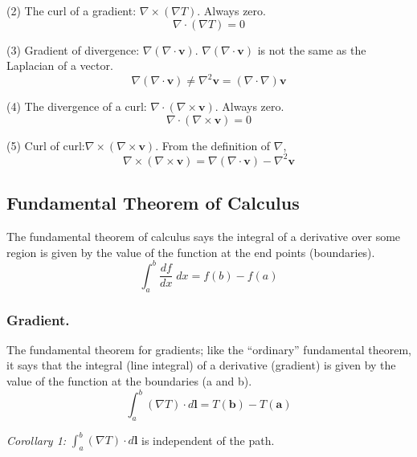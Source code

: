 \documentclass[../../../main.tex]{subfiles}
\begin{document}
(2) The curl of a gradient: $\nabla \times (\nabla T)$. Always zero.
\begin{equation*}
    \nabla \cdot (\nabla T)=0
\end{equation*}

(3) Gradient of divergence: $\nabla  (\nabla \cdot  \mathbf{v})$.
$\nabla  (\nabla \cdot  \mathbf{v})$ is not the same as the Laplacian of a vector.
\begin{equation*}
    \nabla  (\nabla \cdot  \mathbf{v}) \neq \nabla^2  \mathbf{v} = (\nabla \cdot \nabla)  \mathbf{v}
\end{equation*}

(4) The divergence of a curl: $\nabla  \cdot (\nabla \times  \mathbf{v})$. Always zero.
\begin{equation*}
    \nabla \cdot (\nabla \times  \mathbf{v})=0
\end{equation*}

(5) Curl of curl:$\nabla \times (\nabla \times  \mathbf{v})$. From the definition of $\nabla$,
\begin{equation*}
    \nabla \times (\nabla \times  \mathbf{v})=\nabla (\nabla \cdot  \mathbf{v})-\nabla^2 \mathbf{v}
\end{equation*}

\subsection{Fundamental Theorem of Calculus}
The fundamental theorem of calculus says the integral of a derivative over some region is given by the value of the function at the end points (boundaries).
\begin{equation*}
    \int_{a}^{b} \frac{df}{dx}\;dx=f(b)-f(a)
\end{equation*}

\subsubsection{Gradient.} The fundamental theorem for gradients; like the “ordinary” fundamental theorem, it says that the integral (line integral) of a derivative (gradient) is given by the value of the function at the boundaries (a and b).
\begin{equation*}
    \int_{a}^{b}(\nabla T)\cdot d\mathbf{l}=T(\mathbf{b})-T(\mathbf{a})
\end{equation*}

\emph{Corollary 1:} $ \int_{a}^{b}(\nabla T)\cdot d\mathbf{l}$ is independent of the path.
\end{document}
